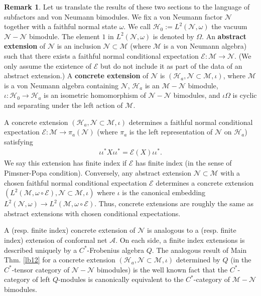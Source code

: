 \documentclass[12pt,a4paper,notitlepage]{article}
\theoremstyle{definition}
\newtheorem{rem}[df]{Remark}
\theoremstyle{plain}
\newcommand{\mc}{\mathcal}
\numberwithin{equation}{section}
\begin{document}
\begin{rem}\label{lb15}
Let us translate the results of these two sections to the language of subfactors and von Neumann bimodules. We fix a von Neumann factor $\mc N$ together with a faithful normal state $\omega$. We call $\mc H_0:=L^2(\mc N,\omega)$ the vacuum $\mc N-\mc N$ bimodule. The element $1$ in $L^2(\mc N,\omega)$ is denoted by $\Omega$. An \textbf{abstract extension} of $\mc N$ is an inclusion $\mc N\subset\mc M$ (where $\mc M$ is a von Neumann algebra) such that there exists a faithful normal conditional expectation $\mc E:\mc M\rightarrow\mc N$. (We only assume the existence of $\mc E$ but do not include it as part of the data of an abstract extension.) A \textbf{concrete extension} of $\mc N$ is $(\mc H_a,\mc N\subset\mc M,\iota)$, where $\mc M$ is a von Neumann algebra containing $\mc N$, $\mc H_a$ is an $\mc M-\mc N$ bimodule, $\iota:\mc H_0\rightarrow\mc H_a$ is an isometric homomorphism of $\mc N-\mc N$ bimodules, and $\iota\Omega$ is cyclic and separating under the left action of $\mc M$.

A concrete extension $(\mc H_a,\mc N\subset\mc M,\iota)$ determines a faithful normal conditional expectation $\mc E:\mc M\rightarrow\pi_a(\mc N)$ (where $\pi_a$ is the left representation of $\mc N$ on $\mc H_a$) satisfying
\begin{align*}
\iota\iota^* X\iota\iota^*=\mc E(X)\iota\iota^*.	
\end{align*}
We say this extension has finite index if $\mc E$ has finite index (in the sense of Pimsner-Popa condition). Conversely, any abstract extension $\mc N\subset \mc M$ with a chosen faithful normal conditional expectation $\mc E$ determines a concrete extension $(L^2(\mc M,\omega\circ\mc E),\mc N\subset\mc M,\iota)$ where $\iota$ is the canonical embedding $L^2(\mc N,\omega)\rightarrow L^2(\mc M,\omega\circ\mc E)$. Thus, concrete extensions are roughly the same as abstract extensions with chosen conditional expectations. 

A (resp. finite index) concrete extension of $\mc N$ is analogous to a (resp. finite index) extension of conformal net $\mc A$.  On each side, a finite index extensions is described uniquely by a $C^*$-Frobenius algebra $Q$. The analogous result of Main Thm. \ref{lb12} for a  concrete extension $(\mc H_a,\mc N\subset\mc M,\iota)$ determined by $Q$ (in the $C^*$-tensor category of $\mc N-\mc N$ bimodules) is the well known fact that the $C^*$-category of left $Q$-modules is canonically equivalent to the $C^*$-category of $\mc M-\mc N$ bimodules.


\end{rem}
\end{document}
